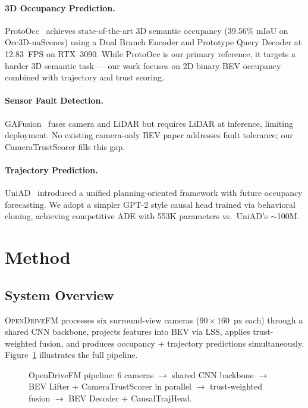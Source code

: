 \documentclass[10pt,twocolumn]{article}
\newcommand{\ours}{\textsc{OpenDriveFM}\xspace}
\begin{document}
\paragraph{3D Occupancy Prediction.}
ProtoOcc~\cite{kim2025protoocc} achieves state-of-the-art 3D semantic
occupancy (39.56\% mIoU on Occ3D-nuScenes) using a Dual Branch
Encoder and Prototype Query Decoder at 12.83~FPS on RTX~3090.
While ProtoOcc is our primary reference, it targets a harder 3D
semantic task --- our work focuses on 2D binary BEV occupancy combined
with trajectory and trust scoring.

\paragraph{Sensor Fault Detection.}
GAFusion~\cite{li2024gafusion} fuses camera and LiDAR but requires
LiDAR at inference, limiting deployment. No existing camera-only BEV
paper addresses fault tolerance; our CameraTrustScorer fills this gap.

\paragraph{Trajectory Prediction.}
UniAD~\cite{hu2023uniad} introduced a unified planning-oriented
framework with future occupancy forecasting. We adopt a simpler GPT-2
style causal head trained via behavioral cloning, achieving competitive
ADE with 553K parameters vs.\ UniAD's $\sim$100M.

\section{Method}
\label{sec:method}

\subsection{System Overview}

\ours processes six surround-view cameras ($90 \times 160$~px each)
through a shared CNN backbone, projects features into BEV via LSS,
applies trust-weighted fusion, and produces occupancy + trajectory
predictions simultaneously. Figure~\ref{fig:pipeline} illustrates the
full pipeline.

\begin{figure}[h]
\centering
{}
\caption{OpenDriveFM pipeline: 6 cameras $\to$ shared CNN backbone
$\to$ BEV Lifter + CameraTrustScorer in parallel $\to$
trust-weighted fusion $\to$ BEV Decoder + CausalTrajHead.}
\label{fig:pipeline}
\end{figure}
\end{document}
